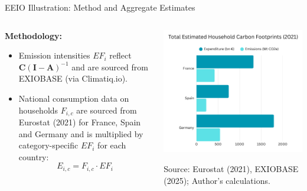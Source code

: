 \documentclass{beamer}
\begin{document}
\begin{frame}{EEIO Illustration: Method and Aggregate Estimates}
\vspace{-2.0em} %
\footnotesize

\begin{columns}[T] %
  \begin{column}{0.40\textwidth}
    \vspace{2.0em}
    \pause
    \textbf{Methodology:}
    \begin{itemize}
      \item Emission intensities \(EF_i\) reflect \( \mathbf{C}(\mathbf{I}-\mathbf{A})^{-1} \) and are sourced from EXIOBASE (via Climatiq.io).
      \pause
      \item National consumption data on households \(F_{i,c}\) are sourced from Eurostat (2021) for France, Spain and Germany and is multiplied by category-specific \(EF_i\) for each country:
      \[
      E_{i,c} = F_{i,c} \cdot EF_i
      \]
    \end{itemize}
    
    
  \end{column}
\pause
  \begin{column}{0.60\textwidth}
    \centering
    \includegraphics[width=\linewidth]{EEIO Visual.png}

    \footnotesize Source: Eurostat (2021), EXIOBASE (2025); Author’s calculations.
  \end{column}
\end{columns}

\end{frame}
\end{document}
